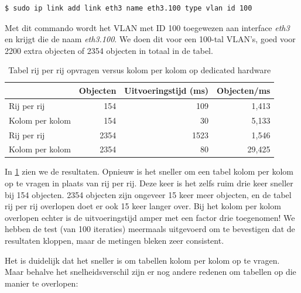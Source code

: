 \begin{lstlisting}[caption={Aanmaken van een VLAN}, label=commando-vlan]
$ sudo ip link add link eth3 name eth3.100 type vlan id 100
\end{lstlisting}

Met dit commando wordt het VLAN met ID 100 toegewezen aan interface \textit{eth3} en krijgt die de naam \textit{eth3.100}.
We doen dit voor een 100-tal VLAN's, goed voor 2200 extra objecten of 2354 objecten in totaal in de tabel.

\begin{table}[h]
\centering
\begin{tabular}{@{}lrrr@{}}
\toprule
                & Objecten & Uitvoeringstijd (ms) & Objecten/ms \\ \midrule
Rij per rij     & 154      & 109                  & 1,413       \\
Kolom per kolom & 154      & 30                   & 5,133       \\
Rij per rij     & 2354     & 1523                 & 1,546       \\
Kolom per kolom & 2354     & 80                   & 29,425      \\ \bottomrule
\end{tabular}
\caption{Tabel rij per rij opvragen versus kolom per kolom op dedicated hardware}
\label{tabel-serieel-vs-parallel-vwall}
\end{table}

In \cref{tabel-serieel-vs-parallel-vwall} zien we de resultaten.
Opnieuw is het sneller om een tabel kolom per kolom op te vragen in plaats van rij per rij.
Deze keer is het zelfs ruim drie keer sneller bij 154 objecten.
2354 objecten zijn ongeveer 15 keer meer objecten, en de tabel rij per rij overlopen doet er ook 15 keer langer over.
Bij het kolom per kolom overlopen echter is de uitvoeringstijd amper met een factor drie toegenomen!
We hebben de test (van 100 iteraties) meermaals uitgevoerd om  te bevestigen dat de resultaten kloppen,
maar de metingen bleken zeer consistent.


Het is duidelijk dat het sneller is om tabellen kolom per kolom op te vragen.
Maar behalve het snelheidsverschil zijn er nog andere redenen om tabellen op die manier te overlopen:

